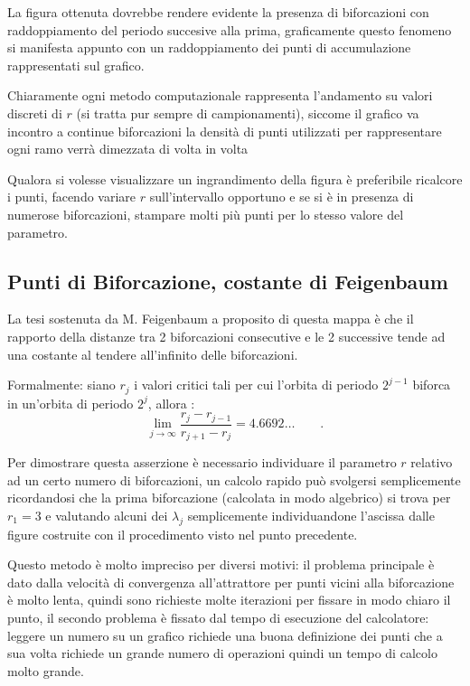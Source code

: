 \documentclass[13pt]{article}
\begin{document}
La figura ottenuta dovrebbe rendere evidente la presenza di biforcazioni con raddoppiamento del periodo succesive alla prima, graficamente questo fenomeno si manifesta appunto con un raddoppiamento dei punti di accumulazione rappresentati sul grafico.

Chiaramente ogni metodo computazionale rappresenta l'andamento su valori discreti di $r$ (si tratta pur sempre di campionamenti), siccome il grafico va incontro a continue biforcazioni la densità di punti utilizzati per rappresentare ogni ramo verrà dimezzata di volta in volta

Qualora si volesse visualizzare un ingrandimento della figura è preferibile ricalcore i punti, facendo variare $r$ sull'intervallo opportuno e se si è in presenza di numerose biforcazioni, stampare molti più punti per lo stesso valore del parametro.

\subsection{Punti di Biforcazione, costante di Feigenbaum}

La tesi sostenuta da M. Feigenbaum a proposito di questa mappa è che il rapporto della distanze tra 2 biforcazioni consecutive e le 2 successive tende ad una costante al tendere all'infinito delle biforcazioni.

Formalmente: siano $r_{j}$ i valori critici tali per cui l'orbita di periodo $2^{j-1}$ biforca in un'orbita di periodo $2^{j}$, allora :
\begin{equation}
		\lim_{j\to \infty}\dfrac{r_{j}-r_{j-1}}{r_{j+1}-r_{j}} =  4.6692\ldots \qquad .
	\end{equation}

Per dimostrare questa asserzione è necessario individuare il parametro $r$ relativo ad un certo numero di biforcazioni, un calcolo rapido può svolgersi semplicemente ricordandosi che la prima biforcazione (calcolata in modo algebrico) si trova per $r_{1} = 3$ e valutando alcuni dei $\lambda_{j}$ semplicemente individuandone l'ascissa dalle figure costruite con il procedimento visto nel punto precedente.

Questo metodo è molto impreciso per diversi motivi: il problema principale è dato dalla velocità di convergenza all'attrattore per punti vicini alla biforcazione è molto lenta, quindi sono richieste molte iterazioni per fissare in modo chiaro il punto, il secondo problema è fissato dal tempo di esecuzione del calcolatore: leggere un numero su un grafico richiede una buona definizione dei punti che a sua volta richiede un grande numero di operazioni quindi un tempo di calcolo molto grande.
\end{document}
